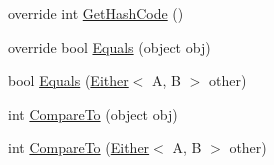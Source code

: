 \begin{DoxyCompactItemize}
override int \mbox{\hyperlink{struct_leap_1_1_unity_1_1_either_a033f69b0b8238d2f434d49d097e94788}{Get\+Hash\+Code}} ()
\item 
override bool \mbox{\hyperlink{struct_leap_1_1_unity_1_1_either_ab1a67555ab3c674e42abce4fd3365134}{Equals}} (object obj)
\item 
bool \mbox{\hyperlink{struct_leap_1_1_unity_1_1_either_ae55d660db9359d936f67d988d7078cc1}{Equals}} (\mbox{\hyperlink{struct_leap_1_1_unity_1_1_either}{Either}}$<$ A, B $>$ other)
\item 
int \mbox{\hyperlink{struct_leap_1_1_unity_1_1_either_a1b677bf5b50b5b6e794821f17b201825}{Compare\+To}} (object obj)
\item 
int \mbox{\hyperlink{struct_leap_1_1_unity_1_1_either_a91e207fc83d8fa9442a9dcfffcdbe2d4}{Compare\+To}} (\mbox{\hyperlink{struct_leap_1_1_unity_1_1_either}{Either}}$<$ A, B $>$ other)
\end{DoxyCompactItemize}

